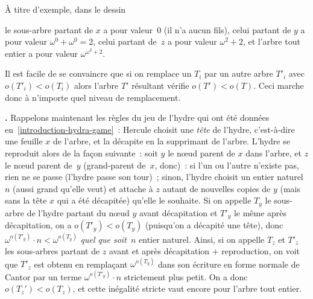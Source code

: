 \documentclass[12pt,a4paper]{article}
\theoremstyle{definition}
\newcommand\thingy{%
\refstepcounter{comcnt}\smallskip\noindent\textbf{\thecomcnt.} }
\begin{document}
À titre d'exemple, dans le dessin
\begin{center}
\end{center}
le sous-arbre partant de $x$ a pour valeur $0$ (il n'a aucun fils),
celui partant de $y$ a pour valeur $\omega^0 + \omega^0 = 2$, celui
partant de $z$ a pour valeur $\omega^2 + 2$, et l'arbre tout entier a
pour valeur $\omega^{\omega^2 + 2}$.

Il est facile de se convaincre que si on remplace un $T_i$ par un
autre arbre $T'_i$ avec $o(T'_i) < o(T_i)$ alors l'arbre $T'$
résultant vérifie $o(T') < o(T)$.  Ceci marche donc à n'importe quel
niveau de remplacement.

\thingy Rappelons maintenant les règles du jeu de l'hydre qui ont été données
en \ref{introduction-hydra-game} : Hercule choisit une \emph{tête} de
l'hydre, c'est-à-dire une feuille $x$ de l'arbre, et la décapite en la
supprimant de l'arbre.  L'hydre se reproduit alors de la façon
suivante : soit $y$ le nœud parent de $x$ dans l'arbre, et $z$ le nœud
parent de $y$ (grand-parent de $x$, donc) : si l'un ou l'autre
n'existe pas, rien ne se passe (l'hydre passe son tour) ; sinon,
l'hydre choisit un entier naturel $n$ (aussi grand qu'elle veut) et
attache à $z$ autant de nouvelles copies de $y$ (mais sans la tête $x$
qui a été décapitée) qu'elle le souhaite.  Si on appelle $T_y$ le
sous-arbre de l'hydre partant du nœud $y$ avant décapitation et $T'_y$
le même après décapitation, on a $o(T'_y) < o(T_y)$ (puisqu'on a
décapité une tête), donc $\omega^{o(T'_y)}\cdot n < \omega^{o(T_y)}$
\emph{quel que soit $n$} entier naturel.  Ainsi, si on appelle $T_z$
et $T'_z$ les sous-arbres partant de $z$ avant et après décapitation +
reproduction, on voit que $T'_z$ est obtenu en remplaçant
$\omega^{o(T_y)}$ dans son écriture en forme normale de Cantor par un
terme $\omega^{o(T'_y)}\cdot n$ strictement plus petit.  On a donc
$o(T_z') < o(T_z)$, et cette inégalité stricte vaut encore pour
l'arbre tout entier.
\end{document}
